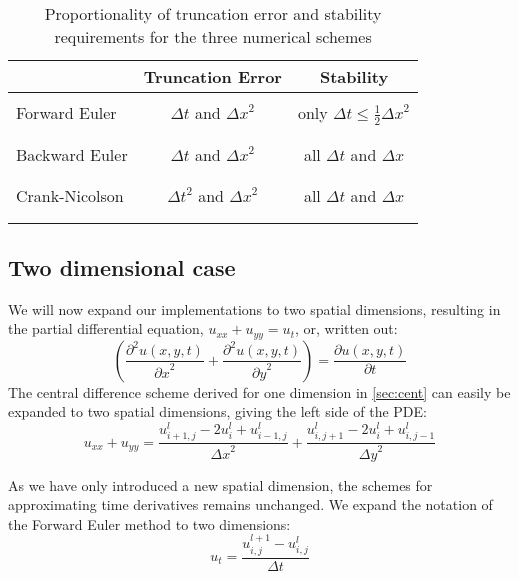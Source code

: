\documentclass[10pt,a4paper]{article}
\newcommand{\dt}{{\Delta t}}
\newcommand{\dx}{{\Delta x}}
\newcommand{\dy}{{\Delta y}}
\newcommand{\pt}{{\partial t}}
\newcommand{\px}{{\partial x}}
\newcommand{\py}{{\partial y}}
\newcommand{\pu}{{\partial u}}
\newcommand{\ppu}{{\partial^2 u}}
\begin{document}
\begin{table}[htb]
\begin{center}
\begin{tabular}{lcc}
 		& Truncation Error	& Stability
\\ \hline \\
Forward Euler	& $\dt$ and $\dx^2$	& only $\dt \le \frac{1}{2}\dx^2$ \\
\\ \hline \\
Backward Euler	& $\dt$ and $\dx^2$	& all $\dt$ and $\dx$ \\
\\ \hline \\
Crank-Nicolson	& $\dt^2$ and $\dx^2$	& all $\dt$ and $\dx$ \\
\\ \hline \\
\end{tabular}
\end{center}
\caption{Proportionality of truncation error and stability requirements for the three numerical schemes}
\label{table:error}
\end{table}


\subsection{Two dimensional case}
We will now expand our implementations to two spatial dimensions, resulting in the partial differential equation, $u_{xx} + u_{yy} = u_t$, or, written out:
\begin{equation}
\left(\frac{\ppu(x,y,t)}{\px^2} + \frac{\ppu(x,y,t)}{\py^2}\right) = \frac{\pu(x,y,t)}{\pt}
\label{eq:diffusion_2d}
\end{equation}
The central difference scheme derived for one dimension in \ref{sec:cent} can easily be expanded to two spatial dimensions, giving the left side of the PDE:
\begin{equation}
u_{xx} + u_{yy} = \frac{u_{i+1,j}^l - 2u_i^l+u_{i-1,j}^l}{\dx^2} + \frac{u_{i,j+1}^l - 2u_i^l+u_{i,j-1}^l}{\dy^2}
\end{equation}

As we have only introduced a new spatial dimension, the schemes for approximating time derivatives remains unchanged. We expand the notation of the Forward Euler method to two dimensions:
\begin{equation}
u_t = \frac{u_{i,j}^{l+1} - u_{i,j}^l}{\dt}
\end{equation}
\end{document}
